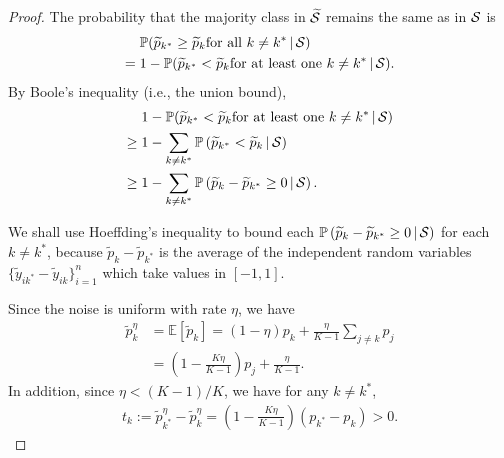 \documentclass[letterpaper]{article} %
\newcommand{\Em}{{\mathbb{E}}}
\newcommand{\Pm}{{\mathbb{P}}}
\newcommand{\gvn}{\,|\,}
\newcommand{\cS}{{\cal{S}}}
\begin{document}
\begin{proof}

    The probability that the majority class in $\widetilde{\cS}$ remains the same as in $\cS$ is
    \begin{align*}
        &\; \Pm
        (
        \widetilde{p}_{k^*}\geq\widetilde{p}_{k}
        \text{for all $k\ne k^*$}
        \gvn \cS
        )
        \\
        =&\; 1-\Pm
        (
        \widetilde{p}_{k^*} < \widetilde{p}_{k}
        \text{for at least one $k\ne k^*$}
        \gvn \cS
        ).
    \end{align*}
    By Boole's inequality (i.e., the union bound),
    \begin{align}
        &\; 1-\Pm
        (
        \widetilde{p}_{k^*} < \widetilde{p}_{k}
        \text{for at least one $k\ne k^*$}
        \gvn \cS
        ) \nonumber
        \\
        \geq&\; 1 - \sum_{k\ne k^*} \Pm\left( \widetilde{p}_{k^*} < \widetilde{p}_{k}
        \gvn \cS
        \right) \nonumber
        \\
        \geq&\; 1 - \sum_{k\ne k^*} \Pm\left( \widetilde{p}_{k} - \widetilde{p}_{k^*} \geq 0
        \gvn
        \cS
        \right).\label{eq:booles}
    \end{align}

    We shall use Hoeffding's inequality to bound each
    $\Pm\left( \widetilde{p}_{k} - \widetilde{p}_{k^*} \geq 0
        \gvn
        \cS
        \right)$ for each $k \neq k^{*}$, because
    $\widetilde{p}_{k} - \widetilde{p}_{k^*}$ is the average of the
    independent random variables
    $\{\widetilde{y}_{ik^*} - \widetilde{y}_{ik}\}_{i=1}^n$
    which take values in $[-1, 1]$.

    Since the noise is uniform with rate $\eta$, we have
    \begin{align*}
        \widetilde{p}_{k}^{\eta}
        &= \Em[\widetilde{p}_{k}]
        = (1-\eta) p_{k} + \frac{\eta}{K-1} \sum_{j \neq k} p_{j} \\
        &= \left(1 - \frac{K\eta}{K-1}\right)p_{j} + \frac{\eta}{K-1}.
    \end{align*}
    In addition, since $\eta < (K-1)/K$, we have for any $k \neq k^{*}$,
    \begin{align*}
        t_{k} := \widetilde{p}_{k^{*}}^{\eta} - \widetilde{p}_{k}^{\eta}
        = \left(1 - \frac{K\eta}{K-1}\right)(p_{k^{*}} - p_{k})
        > 0.
    \end{align*}


\end{proof}
\end{document}
